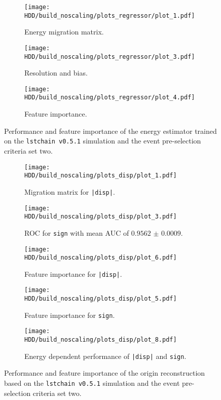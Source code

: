 \begin{figure}
    \centering
    \begin{subfigure}{0.49\textwidth}
        \centering
        \texttt{[image: HDD/build\_noscaling/plots\_regressor/plot\_1.pdf]}
        \caption{Energy migration matrix.}
    \end{subfigure}
    \hfill
    \begin{subfigure}{0.49\textwidth}
        \centering
        \texttt{[image: HDD/build\_noscaling/plots\_regressor/plot\_3.pdf]}
        \caption{Resolution and bias.}
    \end{subfigure}
    \newline\vfill
    \begin{subfigure}{0.7\textwidth}
        \centering
        \texttt{[image: HDD/build\_noscaling/plots\_regressor/plot\_4.pdf]}
        \caption{Feature importance.}
    \end{subfigure}
    \caption{Performance and feature importance of the energy estimator trained on the \texttt{lstchain v0.5.1} simulation and the event pre-selection criteria set two.}
    \label{fig:regressor_oldMC_150}
\end{figure}

\begin{figure}
    \centering
    \begin{subfigure}{0.49\textwidth}
        \centering
        \texttt{[image: HDD/build\_noscaling/plots\_disp/plot\_1.pdf]}
        \caption{Migration matrix for \texttt{|disp|}.}
    \end{subfigure}
    \hfill
    \begin{subfigure}{0.49\textwidth}
        \centering
        \texttt{[image: HDD/build\_noscaling/plots\_disp/plot\_3.pdf]}
        \caption{ROC for \texttt{sign} with mean AUC of $\num{0.9562(9)}$.}
    \end{subfigure}
    \newline\vfill
    \begin{subfigure}{0.49\textwidth}
        \centering
        \texttt{[image: HDD/build\_noscaling/plots\_disp/plot\_6.pdf]}
        \caption{Feature importance for \texttt{|disp|}.}
    \end{subfigure}
    \hfill
    \begin{subfigure}{0.49\textwidth}
        \centering
        \texttt{[image: HDD/build\_noscaling/plots\_disp/plot\_5.pdf]}
        \caption{Feature importance for \texttt{sign}.}
    \end{subfigure}
    \newline\vfill
    \begin{subfigure}{0.7\textwidth}
        \centering
        \texttt{[image: HDD/build\_noscaling/plots\_disp/plot\_8.pdf]}
        \caption{Energy dependent performance of \texttt{|disp|} and \texttt{sign}.}
    \end{subfigure}
    \caption{Performance and feature importance of the origin reconstruction based on the \texttt{lstchain v0.5.1} simulation and the event pre-selection criteria set two.}
    \label{fig:origin_oldMC_150}
\end{figure}

